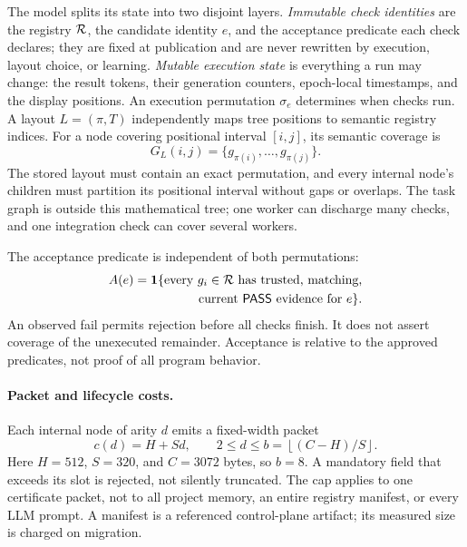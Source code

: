 The model splits its state into two disjoint layers.
\emph{Immutable check identities} are the registry $\mathcal R$, the candidate
identity $e$, and the acceptance predicate each check declares; they are fixed
at publication and are never rewritten by execution, layout choice, or
learning. \emph{Mutable execution state} is everything a run may change: the
result tokens, their generation counters, epoch-local timestamps, and the
display positions. An execution permutation $\sigma_e$ determines when checks
run. A layout $L=(\pi,T)$ independently maps tree positions to semantic
registry indices. For a node covering positional interval $[i,j]$, its semantic
coverage is
\begin{equation}G_L(i,j)=\{g_{\pi(i)},\ldots,g_{\pi(j)}\}.\label{eq:coverage}\end{equation}
The stored layout must contain an exact permutation, and every internal node's
children must partition its positional interval without gaps or overlaps. The
task graph is outside this mathematical tree; one worker can discharge many
checks, and one integration check can cover several workers.

The acceptance predicate is independent of both permutations:
\begin{align}
A(e)=\mathbf 1\{\text{every }g_i\in\mathcal R\text{ has trusted, matching,}\notag\\
\text{current \ensuremath{\mathsf{PASS}}{} evidence for }e\}.\label{eq:accept}\end{align}
An observed fail permits rejection before all checks finish. It does not assert
coverage of the unexecuted remainder. Acceptance is relative to the approved
predicates, not proof of all program behavior.

\paragraph{Packet and lifecycle costs.}\label{sec:packet}
Each internal node of arity $d$ emits a fixed-width packet
\begin{equation}c(d)=H+Sd,\qquad 2\le d\le b=\left\lfloor (C-H)/S\right\rfloor.\label{eq:price}\end{equation}
Here $H=512$, $S=320$, and $C=3072$ bytes, so $b=8$. A mandatory field that
exceeds its slot is rejected, not silently truncated. The cap applies to one
certificate packet, not to all project memory, an entire registry manifest, or
every LLM prompt. A manifest is a referenced control-plane artifact; its measured
size is charged on migration.

